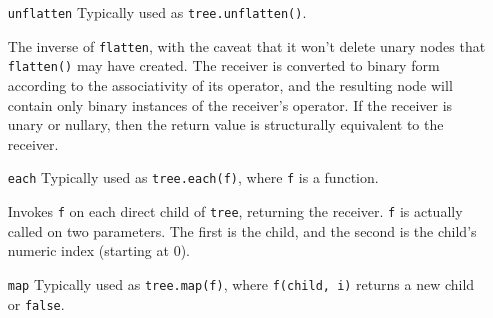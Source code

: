 \documentclass{report}
\begin{document}
\begin{enumerate}
\begin{verbatim}
> caterwaul.parse('3 + 4 + 5').structure()
'("+" ("+" 3 4) 5)'
> caterwaul.parse('3 + 4 + 5').flatten('+').structure()
'("+" 3 4 5)'
>
\end{verbatim}

  {\tt flatten()} takes a string to indicate the kind of node you want to flatten over. This can be any Javascript operator. If the receiver isn't that kind of node, {\tt flatten}
  returns a unary node of the type you provided that contains only the receiver. This is useful for cases like {\tt f(x)}, which can still be flattened under {\tt +} and will become a
  {\tt +} node whose only child is {\tt f(x)}. This means that regardless of the type of the receiver, you can always flatten it and iterate over its children with the same effect.

  Nodes returned from {\tt flatten()} can be used much like arrays; for example, this function will parse and evaluate a numeric sum:

\begin{verbatim}
> evaluate = function (sum_as_string) {
    var terms = caterwaul.parse(sum_as_string).flatten('+');
    for (var i = 0, total = 0, l = terms.length; i < l; ++i)
      total += +terms[i].data;
    return total;
  };
> evaluate('1 + 2 + 3 + 4')
10
>
\end{verbatim}

\item[{\tt unflatten}]
  Typically used as {\tt tree.unflatten()}.

  The inverse of {\tt flatten}, with the caveat that it won't delete unary nodes that {\tt flatten()} may have created. The receiver is converted to binary form according to the
  associativity of its operator, and the resulting node will contain only binary instances of the receiver's operator. If the receiver is unary or nullary, then the return value is
  structurally equivalent to the receiver.

\item[{\tt each}]
  Typically used as {\tt tree.each(f)}, where {\tt f} is a function.

  Invokes {\tt f} on each direct child of {\tt tree}, returning the receiver. {\tt f} is actually called on two parameters. The first is the child, and the second is the child's numeric
  index (starting at 0).

\item[{\tt map}]
  Typically used as {\tt tree.map(f)}, where {\tt f(child, i)} returns a new child or {\tt false}.


\end{enumerate}
\end{document}
